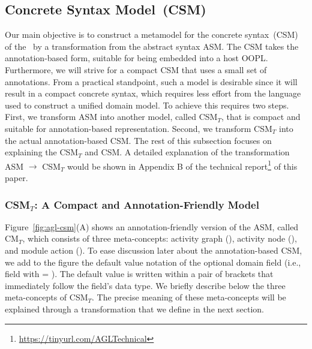 \subsection{Concrete Syntax Model~(CSM)} \label{sect:agl-asm}

Our main objective is to construct a metamodel for the concrete syntax~(CSM) of the \agl~by a transformation from the abstract syntax ASM. The CSM takes the annotation-based form, suitable for being embedded into a host OOPL. Furthermore, we will strive for a compact CSM that uses a small set of annotations. From a practical standpoint, such a model is desirable since it will result in a compact concrete syntax, which requires less effort from the language used to construct a unified domain model. To achieve this requires two steps. First, we transform ASM into another model, called CSM$_T$, that is compact and suitable for annotation-based representation. Second, we transform CSM$_T$ into the actual annotation-based CSM.
%
The rest of this subsection focuses on explaining the CSM$_T$ and CSM. A detailed explanation of the transformation ASM $\rightarrow$ CSM$_T$ would be shown in Appendix B of the technical report\footnote{\url{https://tinyurl.com/AGLTechnical}} of this paper. 

\subsubsection{CSM$_T$: A Compact and Annotation-Friendly Model}
%
Figure~\ref{fig:agl-csm}(A) shows an annotation-friendly version of the ASM, called CM$_T$, which consists of three meta-concepts: activity graph (), activity node (), and module action (). To ease discussion later about the annotation-based CSM, we add to the figure the default value notation of the optional domain field (i.e., field with  = ). The default value is written within a pair of brackets that immediately follow the field's data type.
%
We briefly describe below the three meta-concepts of CSM$_T$. The precise meaning of these meta-concepts will be explained through a transformation that we define in the next section. 

